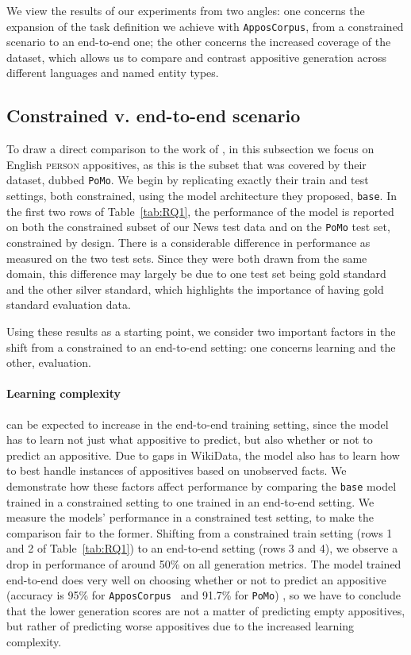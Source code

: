\documentclass[11pt]{article}
\newcommand{\jttodo}[1]{\todo[color=blue!20]{#1}}
\newcommand{\corpus}{\texttt{ApposCorpus}}
\begin{document}
We view the results of our experiments from two angles: one concerns the expansion of the task definition we achieve with \corpus, from a constrained scenario to an end-to-end one; the other concerns the increased coverage of the dataset, which allows us to compare and contrast appositive generation across different languages and named entity types. 

\subsection{Constrained v. end-to-end scenario}
To draw a direct comparison to the work of , in this subsection we focus on English \textsc{person} appositives, as this is the subset that was covered by their dataset, dubbed \texttt{PoMo}. We begin by replicating exactly their train and test settings, both constrained, using the model architecture they proposed, \texttt{base}. In the first two rows of Table~\ref{tab:RQ1}, the performance of the model is reported on both the constrained subset of our News test data and on the \texttt{PoMo} test set, constrained by design. There is a considerable difference in performance as measured on the two test sets. Since they were both drawn from the same domain, this difference may largely be due to one test set being gold standard and the other silver standard, which highlights the importance of having gold standard evaluation data. 

Using these results as a starting point, we consider two important factors in the shift from a constrained to an end-to-end setting: one concerns learning and the other, evaluation. 

\paragraph{Learning complexity} can be expected to increase in the end-to-end training setting, since the model has to learn not just what appositive to predict, but also whether or not to predict an appositive. Due to gaps in WikiData, the model also has to learn how to best handle instances of appositives based on unobserved facts. We demonstrate how these factors affect performance by comparing the \texttt{base} model trained in a constrained setting to one trained in an end-to-end setting. We measure the models' performance in a constrained test setting, to make the comparison fair to the former. Shifting from a constrained train setting (rows 1 and 2 of Table~\ref{tab:RQ1}) to an end-to-end setting (rows 3 and 4), we observe a drop in performance of around 50\% on all generation metrics. The model trained end-to-end does very well on choosing whether or not to predict an appositive (accuracy is 95\% for \corpus~ and 91.7\% for \texttt{PoMo}) , so we have to conclude that the lower generation scores are not a matter of predicting empty appositives, but rather of predicting worse appositives due to the increased learning complexity.
\end{document}
